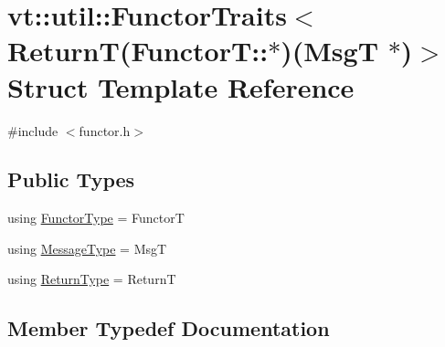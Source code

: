 \hypertarget{structvt_1_1util_1_1_functor_traits_3_01_return_t_07_functor_t_1_1_5_08_07_msg_t_01_5_08_4}{}\section{vt\+:\+:util\+:\+:Functor\+Traits$<$ ReturnT(FunctorT\+:\+:$\ast$)(MsgT $\ast$)$>$ Struct Template Reference}
\label{structvt_1_1util_1_1_functor_traits_3_01_return_t_07_functor_t_1_1_5_08_07_msg_t_01_5_08_4}


{\ttfamily \#include $<$functor.\+h$>$}

\subsection*{Public Types}
\begin{DoxyCompactItemize}
\item 
using \hyperlink{structvt_1_1util_1_1_functor_traits_3_01_return_t_07_functor_t_1_1_5_08_07_msg_t_01_5_08_4_a91c1655fe4f3922080f7cff00c4b99cf}{Functor\+Type} = FunctorT
\item 
using \hyperlink{structvt_1_1util_1_1_functor_traits_3_01_return_t_07_functor_t_1_1_5_08_07_msg_t_01_5_08_4_ae4a897e147f09540cf639c2b2c95b924}{Message\+Type} = MsgT
\item 
using \hyperlink{structvt_1_1util_1_1_functor_traits_3_01_return_t_07_functor_t_1_1_5_08_07_msg_t_01_5_08_4_a3e7f89c39566d8908ee4704df4e94faf}{Return\+Type} = ReturnT
\end{DoxyCompactItemize}


\subsection{Member Typedef Documentation}
\mbox{\label{structvt_1_1util_1_1_functor_traits_3_01_return_t_07_functor_t_1_1_5_08_07_msg_t_01_5_08_4_a91c1655fe4f3922080f7cff00c4b99cf}} 
